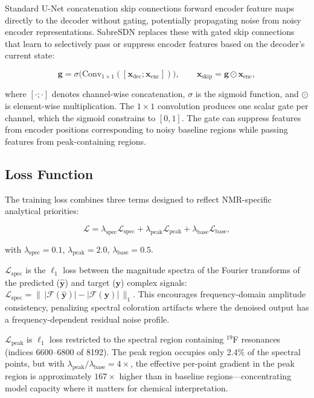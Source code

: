 \documentclass{article}
\begin{document}
Standard U-Net concatenation skip connections forward encoder feature maps directly to the decoder without gating, potentially propagating noise from noisy encoder representations. SabreSDN replaces these with gated skip connections that learn to selectively pass or suppress encoder features based on the decoder's current state:

\begin{equation}
    \mathbf{g} = \sigma\big(\mathrm{Conv}_{1\times1}([\mathbf{x}_{\text{dec}}; \mathbf{x}_{\text{enc}}])\big),\qquad
    \mathbf{x}_{\text{skip}} = \mathbf{g} \odot \mathbf{x}_{\text{enc}},
\end{equation}

where $[\cdot; \cdot]$ denotes channel-wise concatenation, $\sigma$ is the sigmoid function, and $\odot$ is element-wise multiplication. The $1\times1$ convolution produces one scalar gate per channel, which the sigmoid constrains to $[0, 1]$. The gate can suppress features from encoder positions corresponding to noisy baseline regions while passing features from peak-containing regions.

\subsection{Loss Function}

The training loss combines three terms designed to reflect NMR-specific analytical priorities:

\begin{equation}
    \mathcal{L} = \lambda_{\text{spec}}\mathcal{L}_{\text{spec}} + \lambda_{\text{peak}}\mathcal{L}_{\text{peak}} + \lambda_{\text{base}}\mathcal{L}_{\text{base}},
    \label{eq:loss}
\end{equation}

with $\lambda_{\text{spec}} = 0.1$, $\lambda_{\text{peak}} = 2.0$, $\lambda_{\text{base}} = 0.5$.

$\mathcal{L}_{\text{spec}}$ is the $\ell_1$ loss between the magnitude spectra of the Fourier transforms of the predicted ($\hat{\mathbf{y}}$) and target ($\mathbf{y}$) complex signals: $\mathcal{L}_{\text{spec}} = \|\,\lvert\mathcal{F}(\hat{\mathbf{y}})\rvert - \lvert\mathcal{F}(\mathbf{y})\rvert\,\|_1$. This encourages frequency-domain amplitude consistency, penalizing spectral coloration artifacts where the denoised output has a frequency-dependent residual noise profile.

$\mathcal{L}_{\text{peak}}$ is $\ell_1$ loss restricted to the spectral region containing $^{19}$F resonances (indices 6600--6800 of 8192). The peak region occupies only 2.4\% of the spectral points, but with $\lambda_{\text{peak}} / \lambda_{\text{base}} = 4\times$, the effective per-point gradient in the peak region is approximately $167\times$ higher than in baseline regions---concentrating model capacity where it matters for chemical interpretation.
\end{document}
